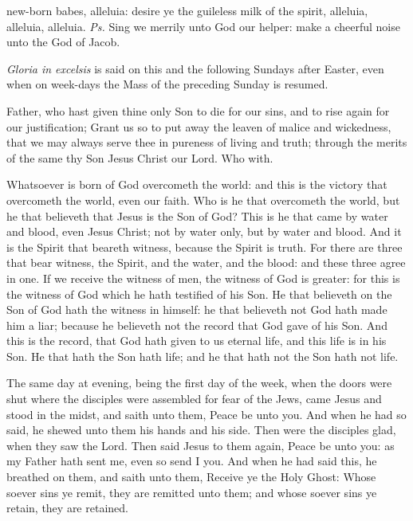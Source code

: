\introit
{} new-born babes, alleluia: desire ye the guileless milk of the spirit, alleluia, alleluia, alleluia. \textit{Ps.} Sing we merrily unto God our helper: make a cheerful noise unto the God of Jacob.
\begin{rubric}
    \emph{Gloria in excelsis} is said on this and the following Sundays after Easter, even when on week-days the Mass of the preceding Sunday is resumed.
\end{rubric}
\collect
{} Father, who hast given thine only Son to die for our sins, and to rise again for our justification; Grant us so to put away the leaven of malice and wickedness, that we may always serve thee in pureness of living and truth; through the merits of the same thy Son Jesus Christ our Lord. Who with.

 Whatsoever is born of God overcometh the world: and this is the victory that overcometh the world, even our faith. Who is he that overcometh the world, but he that believeth that Jesus is the Son of God? This is he that came by water and blood, even Jesus Christ; not by water only, but by water and blood. And it is the Spirit that beareth witness, because the Spirit is truth. For there are three that bear witness, the Spirit, and the water, and the blood: and these three agree in one. If we receive the witness of men, the witness of God is greater: for this is the witness of God which he hath testified of his Son. He that believeth on the Son of God hath the witness in himself: he that believeth not God hath made him a liar; because he believeth not the record that God gave of his Son. And this is the record, that God hath given to us eternal life, and this life is in his Son. He that hath the Son hath life; and he that hath not the Son hath not life.

 The same day at evening, being the first day of the week, when the doors were shut where the disciples were assembled for fear of the Jews, came Jesus and stood in the midst, and saith unto them, Peace be unto you. And when he had so said, he shewed unto them his hands and his side. Then were the disciples glad, when they saw the Lord. Then said Jesus to them again, Peace be unto you: as my Father hath sent me, even so send I you. And when he had said this, he breathed on them, and saith unto them, Receive ye the Holy Ghost: Whose soever sins ye remit, they are remitted unto them; and whose soever sins ye retain, they are retained.

